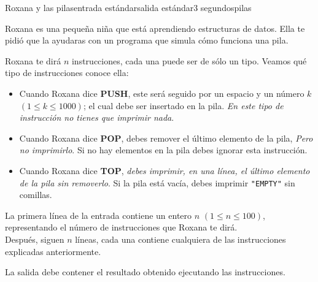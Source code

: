 \begin{problem}{Roxana y las pilas}{entrada estándar}{salida estándar}{3 segundos}{pilas}

Roxana es una pequeña niña que está aprendiendo estructuras de datos. Ella te pidió que la ayudaras con un programa que simula cómo funciona una pila.

Roxana te dirá $n$ instrucciones, cada una puede ser de sólo un tipo. Veamos qué tipo de instrucciones conoce ella:
\begin{itemize}
	\item Cuando Roxana dice \textbf{PUSH}, este será seguido por un espacio y un número $k$ $(1 \leq k \leq 1000)$; el cual debe ser insertado en la pila. \emph{En este tipo de instrucción no tienes que imprimir nada}.
	\item Cuando Roxana dice \textbf{POP}, debes remover el último elemento de la pila, \emph{Pero no imprimirlo}. Si no hay elementos en la pila debes ignorar esta instrucción.
	\item Cuando Roxana dice \textbf{TOP}, \emph{debes imprimir, en una línea, el último elemento de la pila sin removerlo}. Si la pila está vacía, debes imprimir \texttt{"EMPTY"} sin comillas.
\end{itemize}

\InputFile

La primera línea de la entrada contiene un entero $n$ $(1 \leq n \leq 100)$, representando el número de instrucciones que Roxana te dirá.\\
Después, siguen $n$ líneas, cada una contiene cualquiera de las instrucciones explicadas anteriormente.

\OutputFile

La salida debe contener el resultado obtenido ejecutando las instrucciones.

\Example

\begin{example}
%
\end{example}
\end{problem}